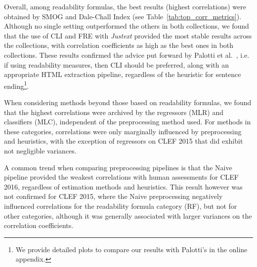 Overall, among readability formulas, the best results (highest correlations) were obtained by SMOG and Dale-Chall Index (see Table~\ref{tab:top_corr_metrics}). Although no single setting outperformed the others in both collections, we found that the use of CLI and FRE with \textit{Justext} provided the most stable results across the collections, with correlation coefficients as high as the best ones in both collections.
These results confirmed the advice put forward by Palotti et al.~\cite{palotti15}, i.e. if using readability measures, then CLI should be preferred, along with an appropriate HTML extraction pipeline, regardless of the heuristic for sentence ending\footnote{We provide detailed plots to compare our results with Palotti's in the online appendix.}.

When considering methods beyond those based on readability formulas, we found that the highest correlations were archived by the regressors (MLR) and classifiers (MLC), independent of the preprocessing method used. For methods in these categories, correlations were only marginally influenced by preprocessing and heuristics, with the exception of regressors on CLEF 2015 that did exhibit not negligible variances.  

A common trend when comparing preprocessing pipelines is that the Naive pipeline provided the weakest correlations with human assessments for CLEF 2016, regardless of estimation methods and heuristics. This result however was not confirmed for CLEF 2015, where the Naive preprocessing negatively influenced correlations for the readability formula category (RF), but not for other categories, although it was generally associated with larger variances on the correlation coefficients.




